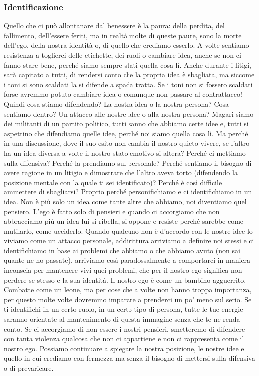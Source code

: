 \documentclass[12pt]{book} %
\begin{document}
\subsubsection{Identificazione}
Quello che ci può allontanare dal benessere è la paura: della perdita, del fallimento,
dell'essere feriti, ma in realtà molte di queste paure, sono la morte dell'ego, della nostra identità o, di quello che crediamo esserlo. A volte sentiamo
resistenza a toglierci delle etichette, dei ruoli o cambiare idea, anche se non ci fanno stare bene, perché siamo
sempre stati quella cosa lì. Anche durante i litigi, sarà capitato a tutti, di rendersi conto che la propria idea è
sbagliata, ma siccome i toni si sono scaldati la si difende a spada tratta. Se i toni non si fossero scaldati forse
avremmo potuto cambiare idea o comunque non passare al contrattacco! Quindi cosa stiamo difendendo? La nostra idea o la
nostra persona? Cosa sentiamo dentro? Un attacco alle nostre idee o alla nostra persona? Magari siamo dei militanti di
un partito politico, tutti sanno che abbiamo certe idee e, tutti si aspettino che difendiamo quelle idee, perché noi
siamo quella cosa lì. Ma perché in una discussione, dove il suo esito non cambia il nostro quieto vivere, se
l'altro ha un idea diversa a volte il nostro stato emotivo si altera? Perché ci mettiamo sulla
difensiva? Perché la prendiamo sul personale? Perché sentiamo il bisogno di avere ragione in un litigio e dimostrare
che l'altro aveva torto (difendendo la posizione mentale con la quale ti sei identificato)? Perché
è così difficile ammettere di sbagliarsi? Proprio perché personifichiamo e ci identifichiamo in un idea. Non è più solo
un idea come tante altre che abbiamo, noi diventiamo quel pensiero. L'ego è fatto solo di pensieri
e quando ci accorgiamo che non abbracciamo più un idea lui si ribella, si oppone e resiste perché sarebbe come
mutilarlo, come ucciderlo. Quando qualcuno non è d'accordo con le nostre idee lo viviamo come un attacco personale,
addirittura arriviamo a definire noi stessi e ci identifichiamo in base ai problemi che abbiamo o che abbiamo avuto
(non sai quante ne ho passate), arriviamo così paradossalmente a comportarci in maniera inconscia per mantenere vivi
quei problemi, che per il nostro ego significa non perdere se stesso e la sua identità. Il nostro ego è come un bambino
agguerrito. Combatte come un leone, ma per cose che a volte non hanno troppa importanza, per questo molte volte
dovremmo imparare a prenderci un po' meno sul serio. Se ti identifichi in un certo ruolo, in un
certo tipo di persona, tutte le tue energie saranno orientate al mantenimento di questa immagine senza che te ne renda
conto. Se ci accorgiamo di non essere i nostri pensieri, smetteremo di difendere con tanta violenza qualcosa che non ci
appartiene e non ci rappresenta come il nostro ego. Possiamo continuare a spiegare la nostra posizione, le nostre idee
e quello in cui crediamo con fermezza ma senza il bisogno di mettersi sulla difensiva o di prevaricare.
\end{document}
